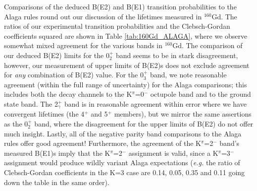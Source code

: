 Comparisons of the deduced B(E2) and B(E1) transition probabilities to the Alaga rules round out our discussion of the lifetimes measured in $^{160}$Gd. The ratios of our experimental transition probabilities and the Clebsch-Gordan coefficients squared are shown in Table \ref{tab:160Gd_ALAGA}, where we observe somewhat mixed agreement for the various bands in $^{160}$Gd. The comparison of our deduced B(E2) limits for the 0$^+_2$ band seems to be in stark disagreement, however, our measurement of upper limits of B(E2)s does not exclude agreement for \textit{any} combination of B(E2) value. For the 0$^+_3$ band, we note reasonable agreement (within the full range of uncertainty) for the Alaga comparisons; this includes both the decay channels to the K$^\pi$=0$^-$ octupole band and to the ground state band. The 2$^+_\gamma$ band is in reasonable agreement within error where we have convergent lifetimes (the 4$^+$ and 5$^+$ members), but we mirror the same assertions as the 0$^+_2$ band, where the disagreement for the upper limits of B(E2) do not offer much insight. Lastly, all of the negative parity band comparisons to the Alaga rules offer good agreement! Furthermore, the agreement of the K$^\pi$=2$^-$ band's measured B(E1)s imply that the K$^\pi$=2$^-$ assignment is valid, since a K$^\pi$=3$^-$ assignment would produce wildly variant Alaga expectations (\textit{e.g.} the ratio of Clebsch-Gordan coefficients in the K=3 case are 0.14, 0.05, 0.35 and 0.11 going down the table in the same order).


